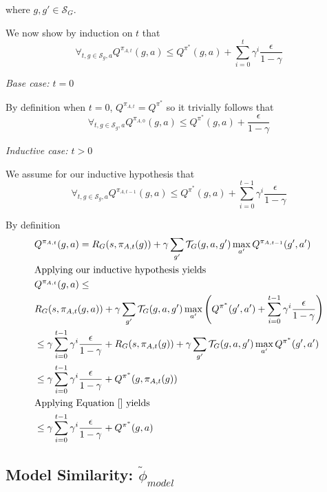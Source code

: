 \documentclass{article}
\newcommand{\ep}{\widetilde \phi}
\begin{document}
where $g, g' \in \mathcal{S}_G$.


We now show by induction on $t$ that
\begin{equation}
\forall_{t, g \in \mathcal{S}_g, a} Q^{\pi_{A,t}}(g, a) \leq Q^{\pi^*}(g,a) + \sum_{i=0}^{t}\gamma^i \frac{\epsilon}{1-\gamma}
\end{equation}

\textit{Base case: $t=0$}

By definition when $t=0$, $Q^{\pi_{A,t}} = Q^{\pi^*}$ so it trivially follows that
\begin{equation}
\forall_{t, g \in \mathcal{S}_g, a} Q^{\pi_{A,0}}(g, a) \leq Q^{\pi^*}(g,a) + \frac{\epsilon}{1-\gamma}
\end{equation}

\textit{Inductive case: $t > 0$}

We assume for our inductive hypothesis that
\begin{equation}
\forall_{t, g \in \mathcal{S}_g, a} Q^{\pi_{A,t-1}}(g, a) \leq Q^{\pi^*}(g,a) + \sum_{i=0}^{t-1}\gamma^i \frac{\epsilon}{1-\gamma}
\end{equation}

By definition 
\begin{align*}
&Q^{\pi_{A,t}}(g, a) = R_G(s, \pi_{A,t}(g)) + \gamma \sum_{g'}\mathcal{T}_G(g, a, g')\max_{a'}Q^{\pi_{A,t-1}}(g', a')\\
&\text{Applying our inductive hypothesis yields}\\
&Q^{\pi_{A,t}}(g, a) \leq\\
&R_G(s, \pi_{A,t}(g, a)) + \gamma \sum_{g'}\mathcal{T}_G(g, a, g')\max_{a'}\left(Q^{\pi^*}(g',a') + \sum_{i=0}^{t-1}\gamma^i \frac{\epsilon}{1-\gamma} \right)\\
&\leq \gamma\sum_{i=0}^{t-1}\gamma^i \frac{\epsilon}{1-\gamma} + R_G(s, \pi_{A,t}(g)) + \gamma \sum_{g'}\mathcal{T}_G(g, a, g')\max_{a'}Q^{\pi^*}(g',a')\\
&\leq \gamma\sum_{i=0}^{t-1}\gamma^i \frac{\epsilon}{1-\gamma} + Q^{\pi^*}(g, \pi_{A,t} (g))\\
&\text{Applying Equation \ref{} yields}\\
&\leq \gamma\sum_{i=0}^{t-1}\gamma^i \frac{\epsilon}{1-\gamma} + Q^{\pi^*}(g, a)\\
\end{align*}
\subsection{Model Similarity: $\ep_{model}$}
\end{document}
